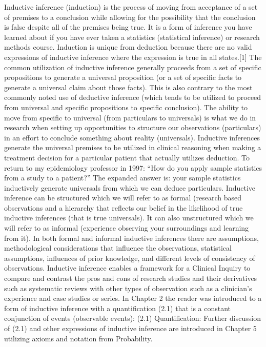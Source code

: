 \documentclass[
]{book}
\begin{document}
Inductive inference (induction) is the process of moving from acceptance of a set of premises to a conclusion while allowing for the possibility that the conclusion is false despite all of the premises being true. It is a form of inference you have learned about if you have ever taken a statistics (statistical inference) or research methods course. Induction is unique from deduction because there are no valid expressions of inductive inference where the expression is true in all states.{[}1{]} The common utilization of inductive inference generally proceeds from a set of specific propositions to generate a universal proposition (or a set of specific facts to generate a universal claim about those facts). This is also contrary to the most commonly noted use of deductive inference (which tends to be utilized to proceed from universal and specific propositions to specific conclusion). The ability to move from specific to universal (from particulars to universals) is what we do in research when setting up opportunities to structure our observations (particulars) in an effort to conclude something about reality (universals). Inductive inferences generate the universal premises to be utilized in clinical reasoning when making a treatment decision for a particular patient that actually utilizes deduction. To return to my epidemiology professor in 1997: ``How do you apply sample statistics from a study to a patient?'' The expanded answer is: your sample statistics inductively generate universals from which we can deduce particulars.
Inductive inference can be structured which we will refer to as formal (research based observations and a hierarchy that reflects our belief in the likelihood of true inductive inferences (that is true universals). It can also unstructured which we will refer to as informal (experience observing your surroundings and learning from it). In both formal and informal inductive inferences there are assumptions, methodological considerations that influence the observations, statistical assumptions, influences of prior knowledge, and different levels of consistency of observations. Inductive inference enables a framework for a Clinical Inquiry to compare and contrast the pros and cons of research studies and their derivatives such as systematic reviews with other types of observation such as a clinician's experience and case studies or series.
In Chapter 2 the reader was introduced to a form of inductive inference with a quantification (2.1) that is a constant conjunction of events (observable events):
(2.1) Quantification:
Further discussion of (2.1) and other expressions of inductive inference are introduced in Chapter 5 utilizing axioms and notation from Probability.
\end{document}
